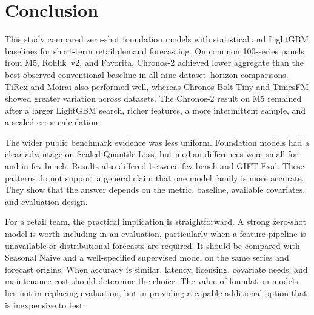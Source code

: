 \section{Conclusion}
\label{sec:conclusions}\label{sec:conclusion}

This study compared zero-shot foundation models with statistical and
LightGBM baselines for short-term retail demand forecasting. On common
100-series panels from M5, Rohlik~v2, and Favorita, Chronos-2 achieved lower
aggregate \WAPE{} than the best observed conventional baseline in all nine
dataset--horizon comparisons. TiRex and Moirai also performed well, whereas
Chronos-Bolt-Tiny and TimesFM showed greater variation across datasets. The
Chronos-2 result on M5 remained after a larger LightGBM search, richer
features, a more intermittent sample, and a scaled-error calculation.

The wider public benchmark evidence was less uniform. Foundation models had a
clear advantage on Scaled Quantile Loss, but median differences were small for
\WAPE{} and \MASE{} in fev-bench. Results also differed between fev-bench and
GIFT-Eval. These patterns do not support a general claim that one model family
is more accurate. They show that the answer depends on the metric, baseline,
available covariates, and evaluation design.

For a retail team, the practical implication is straightforward. A strong
zero-shot model is worth including in an evaluation, particularly when a
feature pipeline is unavailable or distributional forecasts are required. It
should be compared with Seasonal Naive and a well-specified supervised model
on the same series and forecast origins. When accuracy is similar, latency,
licensing, covariate needs, and maintenance cost should determine the choice.
The value of foundation models lies not in replacing evaluation, but in
providing a capable additional option that is inexpensive to test.
\label{subsec:answers-rq}\label{subsec:future-work}
